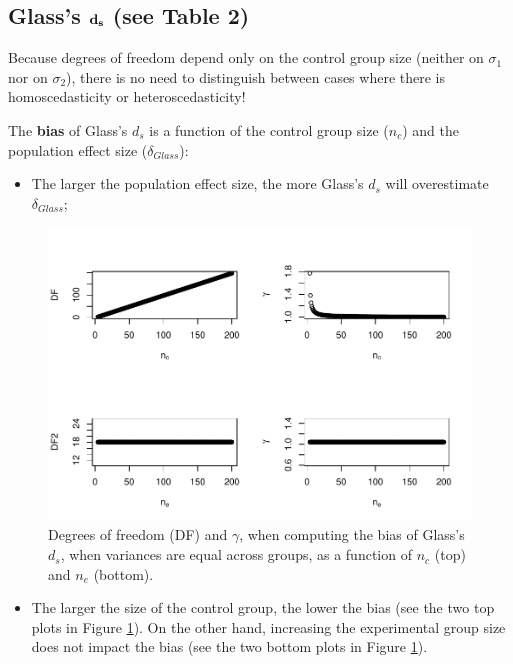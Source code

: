 \documentclass[
  english,
  man]{apa6}
\providecommand{\tightlist}{%
  \setlength{\itemsep}{0pt}\setlength{\parskip}{0pt}}
\begin{document}
\hypertarget{glasss-bf-d_s-see-table-2}{%
\subsection{\texorpdfstring{Glass's \(\bf d_s\) (see Table 2)}{Glass's \textbackslash bf d\_s (see Table 2)}}\label{glasss-bf-d_s-see-table-2}}

Because degrees of freedom depend only on the control group size (neither on \(\sigma_1\) nor on \(\sigma_2\)), there is no need to distinguish between cases where there is homoscedasticity or heteroscedasticity!

The \textbf{bias} of Glass's \(d_s\) is a function of the control group size (\(n_c\)) and the population effect size (\(\delta_{Glass}\)):

\begin{itemize}
\tightlist
\item
  The larger the population effect size, the more Glass's \(d_s\) will overestimate \(\delta_{Glass}\);
\end{itemize}

\begin{figure}
\centering
\includegraphics{Theoretical-Bias-of-all-estimators-as-a-function-of-population-parameters_files/figure-latex/biasGlassctrlsize2-1.pdf}
\caption{\label{fig:biasGlassctrlsize2}Degrees of freedom (DF) and \(\gamma\), when computing the bias of Glass's \(d_s\), when variances are equal across groups, as a function of \(n_c\) (top) and \(n_e\) (bottom).}
\end{figure}

\begin{itemize}
\tightlist
\item
  The larger the size of the control group, the lower the bias (see the two top plots in Figure \ref{fig:biasGlassctrlsize2}). On the other hand, increasing the experimental group size does not impact the bias (see the two bottom plots in Figure \ref{fig:biasGlassctrlsize2}).
\end{itemize}
\end{document}
